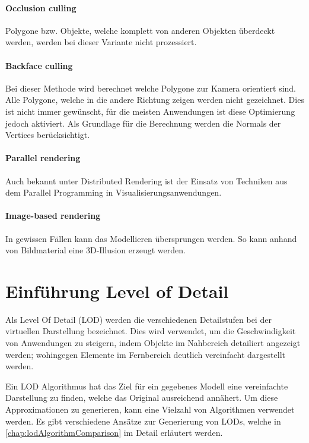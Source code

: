 \paragraph{Occlusion culling}
Polygone bzw. Objekte, welche komplett von anderen Objekten überdeckt werden, werden bei dieser Variante nicht prozessiert.

\paragraph{Backface culling}
\label{chap:backfaceCulling}
Bei dieser Methode wird berechnet welche Polygone zur Kamera orientiert sind.
Alle Polygone, welche in die andere Richtung zeigen werden nicht gezeichnet.
Dies ist nicht immer gewünscht, für die meisten Anwendungen ist diese Optimierung jedoch aktiviert.
Als Grundlage für die Berechnung werden die Normals der Vertices berücksichtigt.

\paragraph{Parallel rendering}
Auch bekannt unter Distributed Rendering ist der Einsatz von Techniken aus dem Parallel Programming in Visualisierungsanwendungen.

\paragraph{Image-based rendering}
In gewissen Fällen kann das Modellieren übersprungen werden. So kann anhand von Bildmaterial eine 3D-Illusion erzeugt werden.

\section{Einführung Level of Detail}
\label{chap:lodIntroduction}
Als Level Of Detail (LOD) werden die verschiedenen Detailstufen bei der virtuellen Darstellung bezeichnet.
Dies wird verwendet, um die Geschwindigkeit von Anwendungen zu steigern, indem Objekte im Nahbereich detailiert angezeigt werden; wohingegen Elemente im Fernbereich deutlich vereinfacht dargestellt werden.

Ein LOD Algorithmus hat das Ziel für ein gegebenes Modell eine vereinfachte Darstellung zu finden, welche das Original ausreichend annähert. Um diese Approximationen zu generieren, kann eine Vielzahl von Algorithmen verwendet werden. Es gibt verschiedene Ansätze zur Generierung von LODs, welche in \autoref{chap:lodAlgorithmComparison} im Detail erläutert werden.

